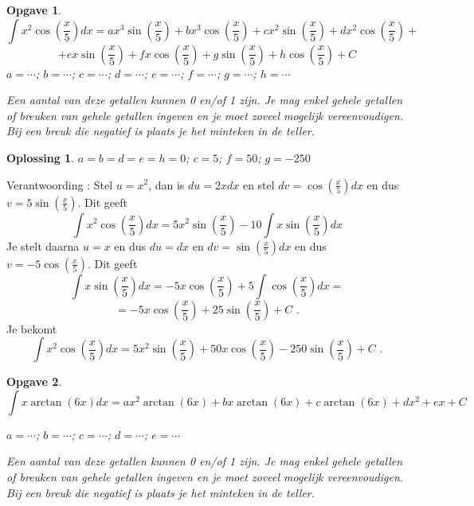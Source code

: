 \documentclass{article}
\newtheorem{opgave}{Opgave}
\newtheorem*{oplossing}{Oplossing}
\begin{document}
\begin{opgave}

\[
\int x^2 \cos \left(  \frac{x}{5} \right) dx=a x^3 \sin \left( \frac{x}{5}  \right) + b x^3 \cos \left( \frac{x}{5}   \right) + c x^2 \sin \left( \frac{x}{5}  \right) + d x^2 \cos \left( \frac{x}{5}   \right)+
\]
\[
 + e x \sin \left( \frac{x}{5}  \right) + f x \cos \left( \frac{x}{5}   \right) + g\sin \left( \frac{x}{5}  \right) + h \cos \left( \frac{x}{5}   \right) + C
\] \vspace{3mm}
\noindent $a= \cdots $; $b= \cdots $; $c= \cdots $; $d= \cdots $; $e=\cdots $; $f=\cdots $; $g=\cdots $; $h= \cdots $ \vspace{1mm}

\noindent Een aantal van deze getallen kunnen 0 en/of 1 zijn. Je mag enkel gehele getallen of breuken van gehele getallen ingeven en je moet zoveel mogelijk vereenvoudigen. Bij een breuk die negatief is plaats je het minteken in de teller.
\end{opgave}

\begin{oplossing}
$a=b=d=e=h=0$; $c=5$; $f=50$; $g=-250$
\end{oplossing}

Verantwoording : Stel $u=x^2$, dan is $du=2xdx$ en stel $dv=\cos \left( \frac{x}{5}  \right)dx$ en dus $v=5 \sin \left( \frac{x}{5} \right)$.
Dit geeft 
\[
\int x^2 \cos \left(  \frac{x}{5} \right) dx = 5x^2 \sin \left(  \frac{x}{5} \right) - 10 \int x \sin \left( \frac{x}{5}  \right)dx
\]
Je stelt daarna $u=x$ en dus $du=dx$ en $dv=\sin \left(  \frac{x}{5} \right) dx$ en dus $v=-5 \cos \left( \frac{x}{5}  \right)$.
Dit geeft
\[
 \int x \sin \left( \frac{x}{5}  \right)dx=-5x \cos \left( \frac{x}{5}  \right) +5 \int \cos \left( \frac{x}{5}  \right)dx =
\]
\[
= -5x \cos \left( \frac{x}{5}  \right) +25 \sin \left( \frac{x}{5} \right)+C \text { .}
\]
Je bekomt
\[
\int x^2 \cos \left(  \frac{x}{5} \right) dx = 5x^2 \sin \left(  \frac{x}{5} \right) + 50 x \cos \left( \frac{x}{5}  \right) -250 \sin \left( \frac{x}{5} \right)+C \text { .}
\]



\begin{opgave}
\[
\int x \arctan (6x)dx=ax^2 \arctan (6x) + bx \arctan (6x) + c \arctan (6x)+d x^2 + ex+C
\]\vspace{3mm}

\noindent $a= \cdots$; $b=\cdots$; $c= \cdots $; $d= \cdots $; $e = \cdots $\vspace{1mm}

\noindent Een aantal van deze getallen kunnen 0 en/of 1 zijn. Je mag enkel gehele getallen of breuken van gehele getallen ingeven en je moet zoveel mogelijk vereenvoudigen. Bij een breuk die negatief is plaats je het minteken in de teller.
\end{opgave}
\end{document}
